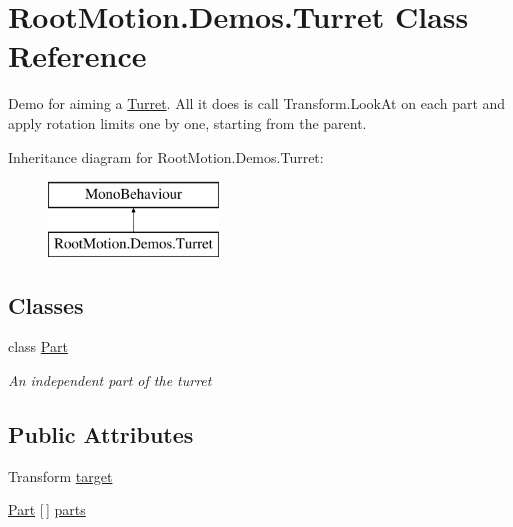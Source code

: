 \hypertarget{class_root_motion_1_1_demos_1_1_turret}{}\section{Root\+Motion.\+Demos.\+Turret Class Reference}
\label{class_root_motion_1_1_demos_1_1_turret}


Demo for aiming a \mbox{\hyperlink{class_root_motion_1_1_demos_1_1_turret}{Turret}}. All it does is call Transform.\+Look\+At on each part and apply rotation limits one by one, starting from the parent.  


Inheritance diagram for Root\+Motion.\+Demos.\+Turret\+:\begin{figure}[H]
\begin{center}
\leavevmode
\includegraphics[height=2.000000cm]{class_root_motion_1_1_demos_1_1_turret}
\end{center}
\end{figure}
\subsection*{Classes}
\begin{DoxyCompactItemize}
\item 
class \mbox{\hyperlink{class_root_motion_1_1_demos_1_1_turret_1_1_part}{Part}}
\begin{DoxyCompactList}\small\item\em An independent part of the turret \end{DoxyCompactList}\end{DoxyCompactItemize}
\subsection*{Public Attributes}
\begin{DoxyCompactItemize}
\item 
Transform \mbox{\hyperlink{class_root_motion_1_1_demos_1_1_turret_a5dac9143646347dc9376b707e13556c5}{target}}
\item 
\mbox{\hyperlink{class_root_motion_1_1_demos_1_1_turret_1_1_part}{Part}} \mbox{[}$\,$\mbox{]} \mbox{\hyperlink{class_root_motion_1_1_demos_1_1_turret_ac1add03df335ff19b61e39f351c21d64}{parts}}
\end{DoxyCompactItemize}



